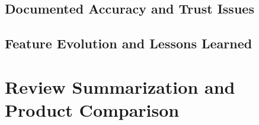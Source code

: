 
\subsection{Documented Accuracy and Trust Issues}
\label{subsec:bg-rufus-problems}


\subsection{Feature Evolution and Lessons Learned}
\label{subsec:bg-rufus-lessons}


\section{Review Summarization and Product Comparison}
\label{sec:bg-review-comparison}

